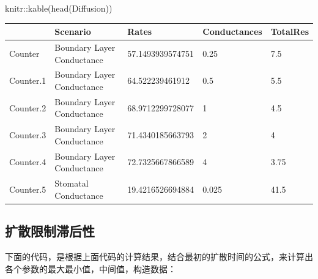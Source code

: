 \documentclass[
]{krantz}
\makeatletter
\newenvironment{Shaded}{\begin{snugshade}}{\end{snugshade}}
\newcommand{\FunctionTok}[1]{\textcolor[rgb]{0.00,0.00,0.00}{#1}}
\newcommand{\NormalTok}[1]{#1}
\newcommand{\SpecialCharTok}[1]{\textcolor[rgb]{0.00,0.00,0.00}{#1}}
\newenvironment{kframe}{%
\medskip{}
\setlength{\fboxsep}{.8em}
 \def\at@end@of@kframe{}%
 \ifinner\ifhmode%
  \def\at@end@of@kframe{\end{minipage}}%
  \begin{minipage}{\columnwidth}%
 \fi\fi%
 \def\FrameCommand##1{\hskip\@totalleftmargin \hskip-\fboxsep
 \colorbox{shadecolor}{##1}\hskip-\fboxsep
     \hskip-\linewidth \hskip-\@totalleftmargin \hskip\columnwidth}%
 \MakeFramed {\advance\hsize-\width
   \@totalleftmargin\z@ \linewidth\hsize
   \@setminipage}}%
 {\par\unskip\endMakeFramed%
 \at@end@of@kframe}
\renewenvironment{Shaded}{\begin{kframe}}{\end{kframe}}
\makeatother
\begin{document}
\begin{Shaded}
\begin{Highlighting}[]
\NormalTok{knitr}\SpecialCharTok{::}\FunctionTok{kable}\NormalTok{(}\FunctionTok{head}\NormalTok{(Diffusion))}
\end{Highlighting}
\end{Shaded}

\begin{tabular}{l|l|l|l|l}
\hline
  & Scenario & Rates & Conductances & TotalRes\\
\hline
Counter & Boundary Layer Conductance & 57.1493939574751 & 0.25 & 7.5\\
\hline
Counter.1 & Boundary Layer Conductance & 64.522239461912 & 0.5 & 5.5\\
\hline
Counter.2 & Boundary Layer Conductance & 68.9712299728077 & 1 & 4.5\\
\hline
Counter.3 & Boundary Layer Conductance & 71.4340185663793 & 2 & 4\\
\hline
Counter.4 & Boundary Layer Conductance & 72.7325667866589 & 4 & 3.75\\
\hline
Counter.5 & Stomatal Conductance & 19.4216526694884 & 0.025 & 41.5\\
\hline
\end{tabular}

\hypertarget{multi12}{%
\subsection{扩散限制滞后性}\label{multi12}}

下面的代码，是根据上面代码的计算结果，结合最初的扩散时间的公式，来计算出各个参数的最大最小值，中间值，构造数据：
\end{document}
